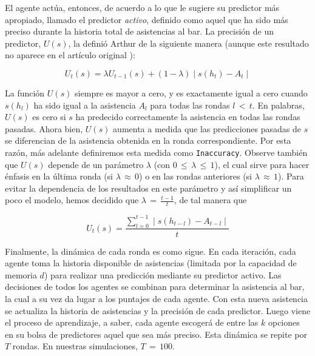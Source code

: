 \documentclass[11pt]{amsart}
\begin{document}
El agente actúa, entonces, de acuerdo a lo que le sugiere su predictor más apropiado, llamado el predictor \emph{activo}, definido como aquel que ha sido más preciso durante la historia total de asistencias al bar. La precisión de un predictor, $U(s)$, la definió Arthur de la siguiente manera (aunque este resultado no aparece en el artículo original \cite{Zambrano2004}):

\vspace{-.5\baselineskip}

\[
U_t(s) = \lambda U_{t-1}(s) + (1-\lambda)\mid s(h_t) - A_t\mid
\]

\vspace{.5\baselineskip}

La función $U(s)$ siempre es mayor a cero, y es exactamente igual a cero cuando $s(h_{l})$ ha sido igual a la asistencia $A_{l}$ para todas las rondas $l\,{<}\,t$. En palabras, $U(s)$ es cero si $s$ ha predecido correctamente la asistencia en todas las rondas pasadas. Ahora bien, $U(s)$ aumenta a medida que las predicciones pasadas de $s$ se diferencian de la asistencia obtenida en la ronda correspondiente. Por esta razón, más adelante definiremos esta medida como \texttt{Inaccuracy}. Observe también que $U(s)$ depende de un parámetro $\lambda$ (con $0\,{\leq}\,\lambda\,{\leq}\,1$), el cual sirve para hacer énfasis en la última ronda (si $\lambda\,{\approx}\,0$) o en las rondas anteriores (si $\lambda\,{\approx}\,1$). Para evitar la dependencia de los resultados en este parámetro y así simplificar un poco el modelo, hemos decidido que $\lambda\,{=}\,\frac{t-1}{t}$, de tal manera que 

\vspace{-.5\baselineskip}

\[
U_t(s) = \frac{\sum_{l=0}^{t-1} \mid s(h_{t-l}) - A_{t-l}\mid}{t}
\]

\vspace{.5\baselineskip}

Finalmente, la dinámica de cada ronda es como sigue. En cada iteración, cada agente toma la historia disponible de asistencias (limitada por la capacidad de memoria $d$) para realizar una predicción mediante su predictor activo. Las decisiones de todos los agentes se combinan para determinar la asistencia al bar, la cual a su vez da lugar a los puntajes de cada agente. Con esta nueva asistencia se actualiza la historia de asistencias y la precisión de cada predictor. Luego  viene el proceso de aprendizaje, a saber, cada agente escogerá de entre las $k$ opciones en su bolsa de predictores aquel que sea más preciso. Esta dinámica se repite por $T$ rondas. En nuestras simulaciones, $T\,{=}\,100$.
\end{document}
